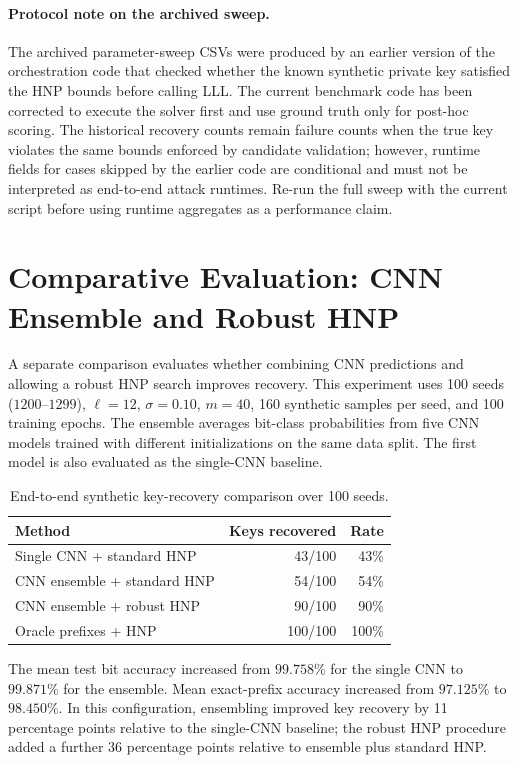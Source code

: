 \documentclass[11pt,a4paper]{article}
\begin{document}
\paragraph{Protocol note on the archived sweep.}
The archived parameter-sweep CSVs were produced by an earlier version of the orchestration code that checked whether the known synthetic private key satisfied the HNP bounds before calling LLL. The current benchmark code has been corrected to execute the solver first and use ground truth only for post-hoc scoring. The historical recovery counts remain failure counts when the true key violates the same bounds enforced by candidate validation; however, runtime fields for cases skipped by the earlier code are conditional and must not be interpreted as end-to-end attack runtimes. Re-run the full sweep with the current script before using runtime aggregates as a performance claim.

\section{Comparative Evaluation: CNN Ensemble and Robust HNP}

A separate comparison evaluates whether combining CNN predictions and allowing a robust HNP search improves recovery. This experiment uses 100 seeds ($1200$--$1299$), $\ell=12$, $\sigma=0.10$, $m=40$, 160 synthetic samples per seed, and 100 training epochs. The ensemble averages bit-class probabilities from five CNN models trained with different initializations on the same data split. The first model is also evaluated as the single-CNN baseline.

\begin{table}[H]
\centering
\small
\caption{End-to-end synthetic key-recovery comparison over 100 seeds.}
\label{tab:ensemble-robust-hnp}
\begin{tabular}{lrr}
\toprule
\textbf{Method} & \textbf{Keys recovered} & \textbf{Rate} \\
\midrule
Single CNN + standard HNP & 43/100 & 43\% \\
CNN ensemble + standard HNP & 54/100 & 54\% \\
CNN ensemble + robust HNP & 90/100 & 90\% \\
Oracle prefixes + HNP & 100/100 & 100\% \\
\bottomrule
\end{tabular}
\end{table}

The mean test bit accuracy increased from $99.758\%$ for the single CNN to $99.871\%$ for the ensemble. Mean exact-prefix accuracy increased from $97.125\%$ to $98.450\%$. In this configuration, ensembling improved key recovery by 11 percentage points relative to the single-CNN baseline; the robust HNP procedure added a further 36 percentage points relative to ensemble plus standard HNP.
\end{document}
